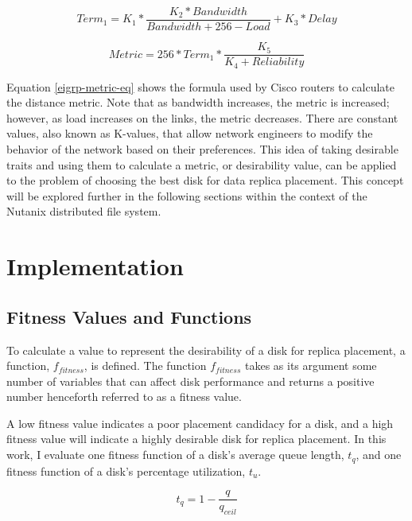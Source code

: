 \documentclass[12pt]{article}
\begin{document}
  \begin{equation}
    Term_{1} = K_{1} * \frac{K_{2} * Bandwidth}{Bandwidth + 256 - Load} + K_{3} * Delay
  \end{equation}

  \begin{equation} \label{eigrp-metric-eq}
    Metric = 256 * Term_{1} * \frac{K_{5}}{K_{4} + Reliability}
  \end{equation}

  Equation \ref{eigrp-metric-eq} shows the formula used by Cisco routers to
  calculate the distance metric. Note that as bandwidth increases, the metric
  is increased; however, as load increases on the links, the metric decreases.
  There are constant values, also known as K-values, that allow network
  engineers to modify the behavior of the network based on their preferences.
  This idea of taking desirable traits and using them to calculate a metric, or
  desirability value, can be applied to the problem of choosing the best disk
  for data replica placement. This concept will be explored further in the
  following sections within the context of the Nutanix distributed file system.


\newpage
\FloatBarrier
\section{Implementation}

  \subsection{Fitness Values and Functions} \label{section-fitness}

  To calculate a value to represent the desirability of a disk for replica
  placement, a function, $f_{fitness}$, is defined. The function $f_{fitness}$
  takes as its argument some number of variables that can affect disk
  performance and returns a positive number henceforth referred to as a fitness
  value.
  
  A low fitness value indicates a poor placement candidacy for a disk, and a
  high fitness value will indicate a highly desirable disk for replica
  placement. In this work, I evaluate one fitness function of a disk's average
  queue length, $t_{q}$, and one fitness function of
  a disk's percentage utilization, $t_{u}$.

  \begin{equation}
    t_{q} = 1 - \frac{q}{q_{ceil}}
  \end{equation}
\end{document}
